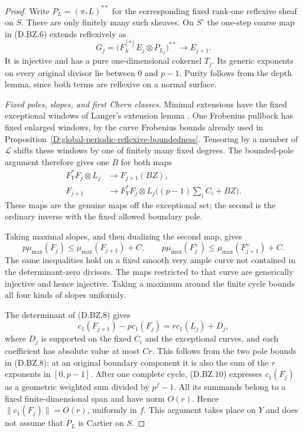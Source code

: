 \begin{proof}
Write $P_L=(\pi_*L)^{**}$ for the corresponding fixed
rank-one reflexive sheaf on $S$.  There are only finitely
many such sheaves.  On $S^\circ$ the one-step coarse
map in (D.BZ.6) extends reflexively as
\[
 G_j=\bigl(F_S^{[*]}E_j\otimes P_{L_j}\bigr)^{**}
                   \longrightarrow E_{j+1}.
                                                        \tag{D.BZ.7}
\]
It is injective and has a pure one-dimensional cokernel $T_j$.
Its generic exponents on every original divisor lie between
$0$ and $p-1$.  Purity follows from the depth lemma, since
both terms are reflexive on a normal surface.

\emph{Fixed poles, slopes, and first Chern classes.}
Minimal extensions have the fixed exceptional windows of
Langer's extension lemma
\citep[Definition~1.2 and Lemma~1.3]{C_Langer2026}.
One Frobenius pullback has fixed enlarged windows, by the
curve Frobenius bounds already used in
Proposition~\ref{D:global-periodic-reflexive-boundedness}.
Tensoring by a member of $\mathscr L$ shifts these windows
by one of finitely many fixed degrees.  The bounded-pole
argument therefore gives one $B$ for both maps
\[
 \begin{split}
 F_Y^*F_j\otimes L_j&\longrightarrow F_{j+1}(BZ),\\
 F_{j+1}&\longrightarrow
 F_Y^*F_j\otimes L_j\bigl((p-1)\textstyle\sum_iC_i+BZ\bigr).
 \end{split}                                            \tag{D.BZ.8}
\]
These maps are the genuine maps off the exceptional set;
the second is the ordinary inverse with the fixed allowed
boundary pole.

Taking maximal slopes, and then dualizing the second map,
gives
\[
 p\mu_{\max}(F_j)\le\mu_{\max}(F_{j+1})+C,\qquad
 p\mu_{\max}(F_j^\vee)\le\mu_{\max}(F_{j+1}^\vee)+C.
                                                        \tag{D.BZ.9}
\]
The same inequalities hold on a fixed smooth very ample
curve not contained in the determinant-zero divisors.
The maps restricted to that curve are generically injective
and hence injective.  Taking a maximum around the finite
cycle bounds all four kinds of slopes uniformly.

The determinant of (D.BZ.8) gives
\[
 c_1(F_{j+1})-p c_1(F_j)
                 =r c_1(L_j)+D_j,                       \tag{D.BZ.10}
\]
where $D_j$ is supported on the fixed $C_i$ and the
exceptional curves, and each coefficient has absolute
value at most $Cr$.  This follows from the two pole bounds
in (D.BZ.8); at an original boundary component it is also
the sum of the $r$ exponents in $[0,p-1]$.
After one complete cycle, (D.BZ.10) expresses $c_1(F_j)$
as a geometric weighted sum divided by $p^f-1$.
All its summands belong to a fixed finite-dimensional
span and have norm $O(r)$.  Hence $\|c_1(F_j)\|=O(r)$,
uniformly in $f$.  This argument takes place on $Y$ and
does not assume that $P_L$ is Cartier on $S$.


\end{proof}
